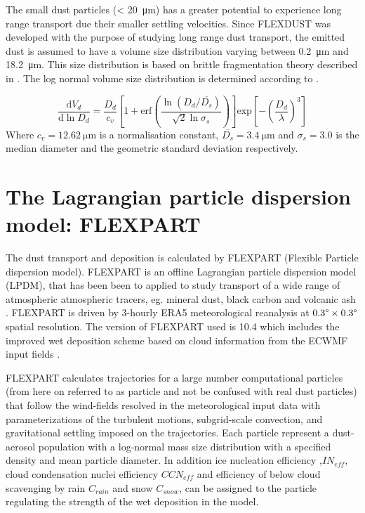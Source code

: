 The small dust particles (< \SI{20}{\micro\metre}) has a greater potential to experience long range transport due their smaller settling velocities. Since FLEXDUST was developed with the purpose of studying long range dust transport, the emitted dust is assumed to have a volume size distribution varying between \SI{0.2}{\micro\metre} and \SI{18.2}{\micro\metre}. This size distribution is based on brittle fragmentation theory described in \textcite{kok_scaling_2011}. The log normal volume size distribution is determined according to . 

\begin{equation}\label{eq:size_dist}
    \frac{\text{d} V_d}{\text{d} \ln D_d} = \frac{D_d}{c_v}\left[1 + \text{erf}\left(\frac{\ln(D_d/\overline{D_s})}{\sqrt{2}\ln \sigma_s}\right)\right]\text{exp}\left[-\left(\frac{D_d}{\lambda}\right)^3\right]
\end{equation}
Where $c_v = \SI{12.62}{\micro\metre}$ is a normalisation constant, $\overline{D_s}=\SI{3.4}{\micro\metre}$ and $\sigma_s = 3.0$ is the median diameter and the geometric standard deviation respectively.  

\section{The Lagrangian particle dispersion model: FLEXPART}

\par The dust transport and deposition is calculated by FLEXPART (Flexible Particle dispersion model). FLEXPART is an offline Lagrangian particle dispersion model (LPDM), that has been been to applied to study transport of a wide range of atmospheric atmospheric tracers, eg. mineral dust, black carbon and volcanic ash \parencite{flexdust_ref_2016,choi_investigation_2020, eckhardt2008estimation}. FLEXPART is driven by 3-hourly ERA5 meteorological reanalysis at $0.3\degree \times 0.3\degree$ spatial resolution. The version of FLEXPART used is 10.4 which includes the improved wet deposition scheme based on cloud information from the ECWMF input fields \parencite{flexpart_wetdep}. 
\par FLEXPART calculates trajectories for a large number computational particles (from here on referred to as particle and not be confused with real dust particles) that follow the wind-fields resolved in the meteorological input data with parameterizations of the turbulent motions, subgrid-scale convection, and gravitational settling imposed on the trajectories. Each particle represent a dust-aerosol population with a log-normal mass size distribution with a specified density and mean particle diameter. In addition ice nucleation efficiency ,$IN_{eff}$, cloud condensation nuclei efficiency $CCN_{eff}$ and efficiency of below cloud scavenging by rain $C_{rain}$ and snow $C_{snow}$, can be assigned to the particle regulating the strength of the wet deposition in the model.   

